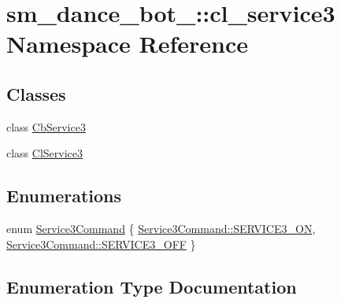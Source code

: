 \hypertarget{namespacesm__dance__bot__3_1_1cl__service3}{}\section{sm\+\_\+dance\+\_\+bot\+\_\+:\+:cl\+\_\+service3 Namespace Reference}
\label{namespacesm__dance__bot__3_1_1cl__service3}
\subsection*{Classes}
\begin{DoxyCompactItemize}
\item 
class \hyperlink{classsm__dance__bot__3_1_1cl__service3_1_1CbService3}{Cb\+Service3}
\item 
class \hyperlink{classsm__dance__bot__3_1_1cl__service3_1_1ClService3}{Cl\+Service3}
\end{DoxyCompactItemize}
\subsection*{Enumerations}
\begin{DoxyCompactItemize}
\item 
enum \hyperlink{namespacesm__dance__bot__3_1_1cl__service3_a778128d056f05186ada82c9b0b210be5}{Service3\+Command} \{ \hyperlink{namespacesm__dance__bot__3_1_1cl__service3_a778128d056f05186ada82c9b0b210be5a13cdca48a01bbb44fa8fb35567fbc58e}{Service3\+Command\+::\+S\+E\+R\+V\+I\+C\+E3\+\_\+\+ON}, 
\hyperlink{namespacesm__dance__bot__3_1_1cl__service3_a778128d056f05186ada82c9b0b210be5a642ed22a7f6b816840289b4256116e9e}{Service3\+Command\+::\+S\+E\+R\+V\+I\+C\+E3\+\_\+\+O\+FF}
 \}
\end{DoxyCompactItemize}


\subsection{Enumeration Type Documentation}
